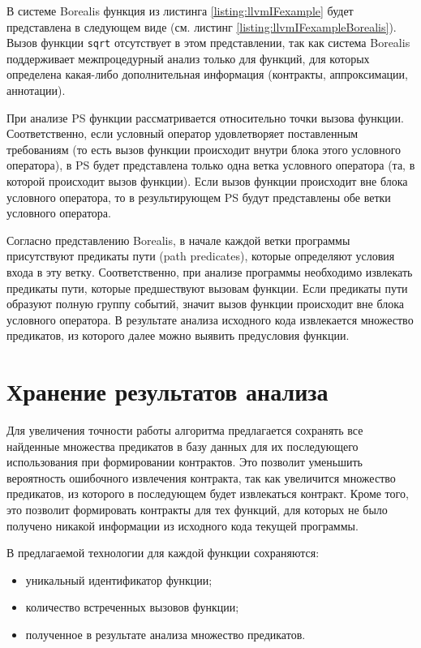 В системе Borealis функция из листинга \ref{listing:llvmIFexample} будет представлена в следующем виде (см. листинг \ref{listing:llvmIFexampleBorealis}). Вызов функции \texttt{sqrt} отсутствует в этом представлении, так как система Borealis поддерживает межпроцедурный анализ только для функций, для которых определена какая-либо дополнительная информация (контракты, аппроксимации, аннотации).


При анализе PS функции рассматривается относительно точки вызова функции. Соответственно, если условный оператор удовлетворяет поставленным требованиям (то есть вызов функции происходит внутри блока этого условного оператора), в PS будет представлена только одна ветка условного оператора (та, в которой происходит вызов функции). Если вызов функции происходит вне блока условного оператора, то в результирующем PS будут представлены обе ветки условного оператора.

Согласно представлению Borealis, в начале каждой ветки программы присутствуют предикаты пути (path predicates), которые определяют условия входа в эту ветку. Соответственно, при анализе программы необходимо извлекать предикаты пути, которые предшествуют вызовам функции. Если предикаты пути образуют полную группу событий, значит вызов функции происходит вне блока условного оператора. В результате анализа исходного кода извлекается множество предикатов, из которого далее можно выявить предусловия функции.

\section{Хранение результатов анализа}
\label{section:saving}
Для увеличения точности работы алгоритма предлагается сохранять все найденные множества предикатов в базу данных для их последующего использования при формировании контрактов. Это позволит уменьшить вероятность ошибочного извлечения контракта, так как увеличится множество предикатов, из которого в последующем будет извлекаться контракт. Кроме того, это позволит формировать контракты для тех функций, для которых не было получено никакой информации из исходного кода текущей программы.

В предлагаемой технологии для каждой функции сохраняются:
\begin{itemize}
\item уникальный идентификатор функции;
\item количество встреченных вызовов функции;
\item полученное в результате анализа множество предикатов.
\end{itemize}


